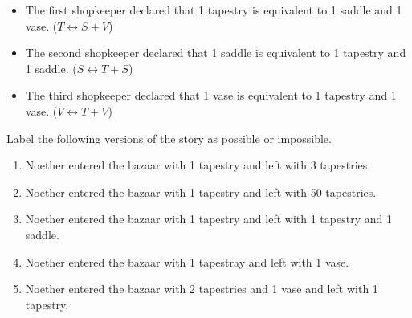 \begin{itemize}
\item The first shopkeeper declared that 1 tapestry is equivalent to 1 saddle and 1 vase. (\(T \leftrightarrow S + V\))
\item The second shopkeeper declared that 1 saddle is equivalent to 1 tapestry and 1 saddle. (\(S \leftrightarrow T + S\))
\item The third shopkeeper declared that 1 vase is equivalent to 1 tapestry and 1 vase. (\(V \leftrightarrow T + V\))
\end{itemize}

Label the following versions of the story as possible or impossible.
\begin{enumerate}
\item Noether entered the bazaar with 1 tapestry and left with 3 tapestries.
\item Noether entered the bazaar with 1 tapestry and left with 50 tapestries.
\item Noether entered the bazaar with 1 tapestry and left with 1 tapestry and 1 saddle.
\item Noether entered the bazaar with 1 tapestray and left with 1 vase.
\item Noether entered the bazaar with 2 tapestries and 1 vase and left with 1 tapestry.
\end{enumerate}


